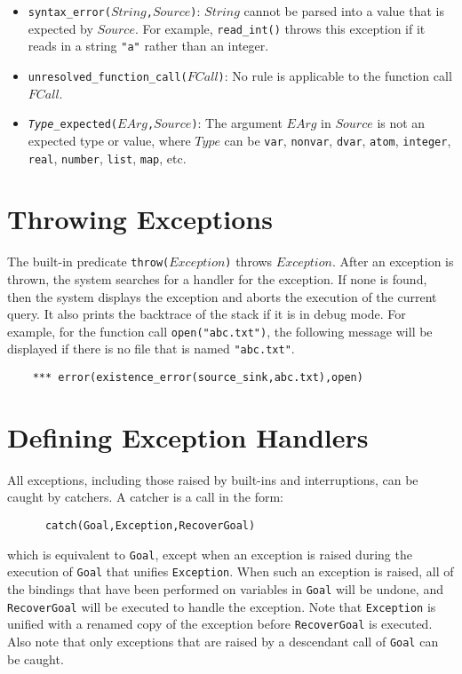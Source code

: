 \begin{itemize}
\item \texttt{syntax\_error($String$,$Source$)}: $String$ cannot be parsed into a value that is expected by $Source$. For example, \texttt{read\_int()} throws this exception if it reads in a string \texttt{"a"} rather than an integer.
\item \texttt{unresolved\_function\_call($FCall$)}: No rule is applicable to the function call $FCall$.
\item \texttt{\emph{Type}\_expected($EArg$,$Source$)}: The argument $EArg$ in $Source$ is not an expected type or value, where $Type$ can be \texttt{var}, \texttt{nonvar}, \texttt{dvar}, \texttt{atom}, \texttt{integer}, \texttt{real}, \texttt{number}, \texttt{list}, \texttt{map}, etc.
\end{itemize}

\section{Throwing Exceptions}
The built-in predicate \texttt{throw($Exception$)}  throws $Exception$. After an exception is thrown, the system searches for a handler for the exception. If none is found, then the system displays the exception and aborts the execution of the current query. It also prints the backtrace of the stack if it is in debug mode. For example, for the function call \texttt{open("abc.txt")}, the following message will be displayed if there is no file that is named \texttt{"abc.txt"}.
\begin{verbatim}
    *** error(existence_error(source_sink,abc.txt),open)
\end{verbatim}

\section{Defining Exception Handlers}
All exceptions, including those raised by built-ins and interruptions, can be caught by catchers. A catcher is a call in the form:
\begin{verbatim}
      catch(Goal,Exception,RecoverGoal)
\end{verbatim}
which is equivalent to \texttt{Goal}, except when an exception is raised during the execution of \texttt{Goal} that unifies \texttt{Exception}. When such an exception is raised, all of the bindings that have been performed on variables in \texttt{Goal} will be undone, and \texttt{RecoverGoal} will be executed to handle the exception. Note that \texttt{Exception} is unified with a renamed copy of the exception before \texttt{RecoverGoal} is executed. Also note that only exceptions that are raised by a descendant call of \texttt{Goal} can be caught.

